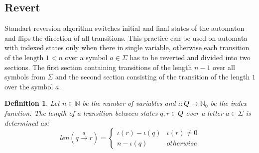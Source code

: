 \documentclass[pdflatex,sn-mathphys-num]{sn-jnl}%
\theoremstyle{thmstyleone}%
\theoremstyle{thmstyletwo}%
\theoremstyle{thmstylethree}%
\newtheorem{definition}{Definition}%
\begin{document}
    \subsection{Revert}
        Standart reversion algorithm switches initial and final states of the automaton and flips the direction of all transitions. This practice can be used on automata with indexed states only when there in single variable, otherwise each transition of the length $1 < n$ over a symbol $a \in \Sigma$ has to be reverted and divided into two sections. The first section containing transitions of the length $n - 1$ over all symbols from $\Sigma$ and the second section consisting of the transition of the length $1$ over the symbol $a$.

        \vspace*{0.5em}

        \begin{definition}
            Let $n \in \mathbb{N}$ be the number of variables and $\iota : Q \rightarrow \mathbb{N}_0$ be the index function. The length of a transition between states $q, r \in Q$ over a letter $a \in \Sigma$ is determined as:
            $$
            len(q \xrightarrow[]{a} r) =
            \begin{cases}
                \iota(r) - \iota(q) & \iota(r) \neq 0\\
                n - \iota(q) & otherwise
            \end{cases}
            $$
        \end{definition}

        \vspace*{0.5em}
\end{document}
